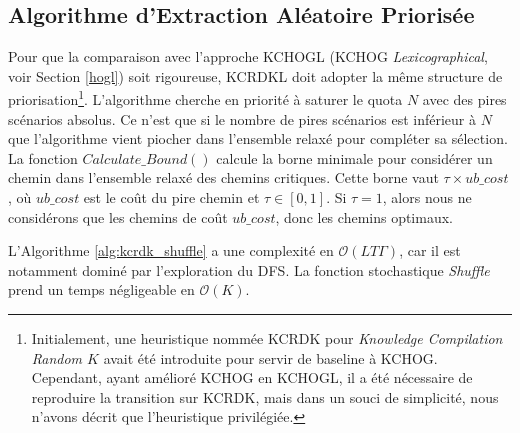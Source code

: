 \documentclass[11pt,a4paper]{article}
\begin{document}
\subsection{Algorithme d'Extraction Aléatoire Priorisée}

Pour que la comparaison avec l'approche KCHOGL (KCHOG \textit{Lexicographical}, voir Section \ref{hogl}) soit rigoureuse, KCRDKL doit adopter la même structure de priorisation\footnote{Initialement, une heuristique nommée KCRDK pour \textit{Knowledge Compilation Random $K$} avait été introduite pour servir de baseline à KCHOG. Cependant, ayant amélioré KCHOG en KCHOGL, il a été nécessaire de reproduire la transition sur KCRDK, mais dans un souci de simplicité, nous n'avons décrit que l'heuristique privilégiée.}. L'algorithme cherche en priorité à saturer le quota $N$ avec des pires scénarios absolus. Ce n'est que si le nombre de pires scénarios est inférieur à $N$ que l'algorithme vient piocher dans l'ensemble relaxé pour compléter sa sélection. La fonction $Calculate\_Bound()$ calcule la borne minimale pour considérer un chemin dans l'ensemble relaxé des chemins critiques. Cette borne vaut $\tau \times ub\_cost$, où $ub\_cost$ est le coût du pire chemin et $\tau\in[0, 1]$. Si $\tau=1$, alors nous ne considérons que les chemins de coût $ub\_cost$, donc les chemins optimaux.

L'Algorithme \ref{alg:kcrdk_shuffle} a une complexité en $\mathcal{O}(LT\Gamma)$, car il est notamment dominé par l'exploration du DFS. La fonction stochastique \textit{Shuffle} prend un temps négligeable en $\mathcal{O}(K)$.
\end{document}

